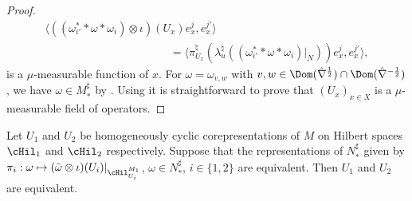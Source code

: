 \begin{proof}
\begin{gather*}
\langle ((\omega_{i'}^\ast \ast \omega \ast \omega_i) \otimes \iota)(U_x) e^j_x, e^{j'}_x \rangle\\
\phantom{\langle (\omega \otimes \iota)(U_x) f^{i,j}_x, f^{i',j'}_x \rangle}{} =
 \langle \pi_{U_x}^\natural(\lambda_u^\natural((\omega_{i'}^\ast \ast \omega \ast \omega_i)\vert_N))  e^j_x, e^{j'}_x \rangle,
\end{gather*}
is a $\mu$-measurable function of $x$. For $\omega = \omega_{v, w}$ with $v,w \in \Dom(\hat{\nabla}^{\frac{1}{2}}) \cap \Dom(\hat{\nabla}^{- \frac{1}{2}} )$, we have $\omega \in M_\ast^\sharp$ by \cite[Proposition~1.10]{Des}. Using \cite[Proposition~II.1.10 and~II.2.1]{DixVNA} it is straightforward to prove that $(U_x)_{x \in X}$ is a $\mu$-measurable f\/ield of operators.
\end{proof}


\begin{prop}\label{PropEqRepCorep}
 Let $U_1$ and $U_2$ be homogeneously cyclic corepresentations of $M$ on Hilbert spaces $\cHil_1$ and $\cHil_2$ respectively. Suppose that the  representations of $N_\ast^\sharp$ given by $\pi_i: \omega \mapsto (\tilde{\omega} \otimes \iota)(U_i)\vert_{\cHil_{U_i}^{M_1}}$, $\omega \in N_\ast^\sharp$, $i \in \{ 1,2\}$ are equivalent. Then $U_1$ and $U_2$ are equivalent.
\end{prop}

